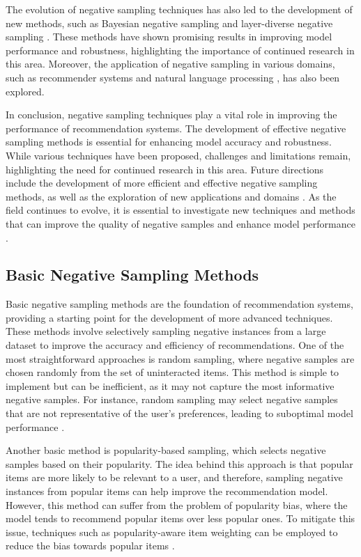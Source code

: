 \documentclass[11pt,a4paper]{article}
\begin{document}
The evolution of negative sampling techniques has also led to the development of new methods, such as Bayesian negative sampling \cite{doi:10.1109/icde55515.2023.00063} and layer-diverse negative sampling \cite{arxiv:2403.11408}. These methods have shown promising results in improving model performance and robustness, highlighting the importance of continued research in this area. Moreover, the application of negative sampling in various domains, such as recommender systems \cite{doi:10.1145/3366423.3380187} and natural language processing \cite{arxiv:2010.12523}, has also been explored.

In conclusion, negative sampling techniques play a vital role in improving the performance of recommendation systems. The development of effective negative sampling methods is essential for enhancing model accuracy and robustness. While various techniques have been proposed, challenges and limitations remain, highlighting the need for continued research in this area. Future directions include the development of more efficient and effective negative sampling methods, as well as the exploration of new applications and domains \cite{doi:10.1109/tpami.2024.3371473}. As the field continues to evolve, it is essential to investigate new techniques and methods that can improve the quality of negative samples and enhance model performance \cite{doi:10.1007/978-3-030-47436-2_46}.


\subsection{Basic Negative Sampling Methods}


Basic negative sampling methods are the foundation of recommendation systems, providing a starting point for the development of more advanced techniques. These methods involve selectively sampling negative instances from a large dataset to improve the accuracy and efficiency of recommendations. One of the most straightforward approaches is random sampling, where negative samples are chosen randomly from the set of uninteracted items. This method is simple to implement but can be inefficient, as it may not capture the most informative negative samples. For instance, random sampling may select negative samples that are not representative of the user's preferences, leading to suboptimal model performance \cite{doi:10.1145/3097983.3098202}.

Another basic method is popularity-based sampling, which selects negative samples based on their popularity. The idea behind this approach is that popular items are more likely to be relevant to a user, and therefore, sampling negative instances from popular items can help improve the recommendation model. However, this method can suffer from the problem of popularity bias, where the model tends to recommend popular items over less popular ones. To mitigate this issue, techniques such as popularity-aware item weighting can be employed to reduce the bias towards popular items \cite{arxiv:1802.05382}.
\end{document}
